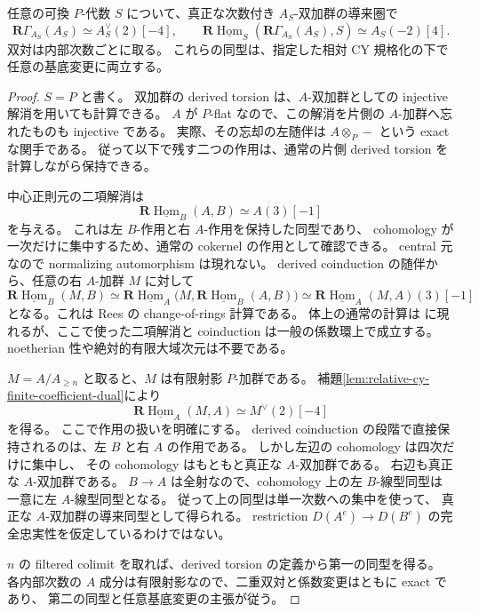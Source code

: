 \begin{proposition}[三次商の相対局所双対]
\label{prop:relative-cubic-local-bimodule-dual}
任意の可換 $P$-代数 $S$ について、真正な次数付き $A_S$-双加群の導来圏で
\begin{equation}\label{eq:relative-cubic-local-bimodule-dual}
 \mathbf R\Gamma_{A_S}(A_S)
 \simeq A_S^\vee(2)[-4],
 \qquad
 \mathbf R\underline{\operatorname{Hom}}_S
       (\mathbf R\Gamma_{A_S}(A_S),S)
 \simeq A_S(-2)[4].
\end{equation}
双対は内部次数ごとに取る。
これらの同型は、指定した相対 CY 規格化の下で任意の基底変更に両立する。
\end{proposition}

\begin{proof}
$S=P$ と書く。
双加群の derived torsion は、$A$-双加群としての injective 解消を用いても計算できる。
$A$ が $P$-flat なので、この解消を片側の $A$-加群へ忘れたものも injective である。
実際、その忘却の左随伴は $A\otimes_P-$ という exact な関手である。
従って以下で残す二つの作用は、通常の片側 derived torsion を計算しながら保持できる。

中心正則元の二項解消は
\[
 \mathbf R\underline{\operatorname{Hom}}_B(A,B)
 \simeq A(3)[-1]
\]
を与える。
これは左 $B$-作用と右 $A$-作用を保持した同型であり、
cohomology が一次だけに集中するため、通常の cokernel の作用として確認できる。
central 元なので normalizing automorphism は現れない。
derived coinduction の随伴から、任意の右 $A$-加群 $M$ に対して
\[
 \mathbf R\underline{\operatorname{Hom}}_B(M,B)
 \simeq
 \mathbf R\underline{\operatorname{Hom}}_A
       \bigl(M,\mathbf R\underline{\operatorname{Hom}}_B(A,B)\bigr)
 \simeq
 \mathbf R\underline{\operatorname{Hom}}_A(M,A)(3)[-1]
\]
となる。これは Rees の change-of-rings 計算である。
体上の通常の計算は \cite[arXiv v1, Lemma~4.4 の証明および Lemma~4.5 の証明]{CSBGCCKM}
に現れるが、ここで使った二項解消と coinduction は一般の係数環上で成立する。
noetherian 性や絶対的有限大域次元は不要である。

$M=A/A_{\geq n}$ と取ると、$M$ は有限射影 $P$-加群である。
補題\ref{lem:relative-cy-finite-coefficient-dual}により
\[
 \mathbf R\underline{\operatorname{Hom}}_A(M,A)
 \simeq M^\vee(2)[-4]
\]
を得る。
ここで作用の扱いを明確にする。
derived coinduction の段階で直接保持されるのは、左 $B$ と右 $A$ の作用である。
しかし左辺の cohomology は四次だけに集中し、
その cohomology はもともと真正な $A$-双加群である。
右辺も真正な $A$-双加群である。
$B\to A$ は全射なので、cohomology 上の左 $B$-線型同型は
一意に左 $A$-線型同型となる。
従って上の同型は単一次数への集中を使って、
真正な $A$-双加群の導来同型として得られる。
restriction $D(A^e)\to D(B^e)$ の完全忠実性を仮定しているわけではない。

$n$ の filtered colimit を取れば、derived torsion の定義から第一の同型を得る。
各内部次数の $A$ 成分は有限射影なので、二重双対と係数変更はともに exact であり、
第二の同型と任意基底変更の主張が従う。
\end{proof}

